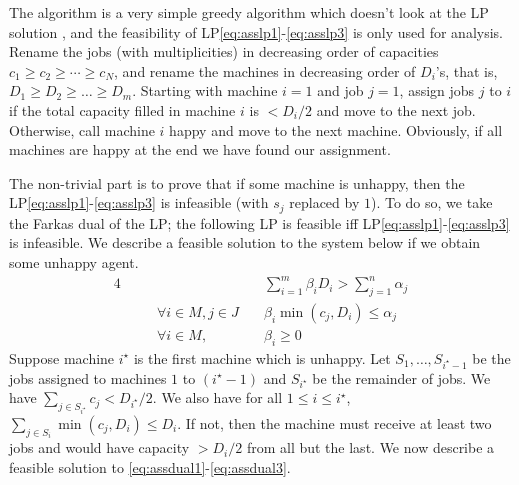 %

The algorithm is a  very simple greedy algorithm which doesn't look at the LP solution , and the feasibility of LP\eqref{eq:asslp1}-\eqref{eq:asslp3} is only used for analysis.  
Rename the jobs (with multiplicities) in decreasing order of capacities $c_1\geq c_2 \geq \cdots \geq c_N$, and rename  the machines in decreasing order of $D_i$'s, that is, $D_1 \geq D_2 \geq \ldots \geq D_m$. 
Starting with machine $i=1$ and job $j=1$, assign jobs $j$ to $i$ if the total capacity filled in machine $i$ is $< D_i/2$ and move to the next job. Otherwise, call machine $i$ happy and move to the next machine. Obviously, if all machines are happy at the end we have found our assignment. 

The non-trivial part is to  prove that if some machine is unhappy, then the LP\eqref{eq:asslp1}-\eqref{eq:asslp3} is infeasible (with $s_j$ replaced by $1$).
To do so, we take the Farkas dual of the LP; the following LP is feasible iff LP\eqref{eq:asslp1}-\eqref{eq:asslp3} is infeasible. We describe a feasible solution to the system below if we obtain some unhappy agent.
	\begin{alignat}{4}
		&&   & \quad \textstyle \sum_{i=1}^m \beta_i D_i > \sum_{j=1}^n\alpha_j \label{eq:assdual1}  \tag{F1} \\
		&& \quad \forall i\in M,j\in J & \quad \textstyle \beta_i\min(c_j,D_i) \leq \alpha_j \label{eq:assdual2} \tag{F2}  \\
		&& \quad \forall i\in M, &\quad  \beta_i \geq 0\label{eq:assdual3}\tag{F3}
	\end{alignat}
	\def\i{i^\star}
Suppose machine $\i$ is the first machine which is unhappy. Let $S_1,\ldots,S_{\i-1}$ be the jobs assigned to machines $1$ to $(\i-1)$ and $S_{i^\star}$ be the remainder of jobs. 
We have $\sum_{j\in S_{\i}} c_j < D_{\i}/2$. We also have for all $1\leq i\leq \i$, $\sum_{j\in S_i} \min(c_j,D_i) \leq D_i$. If not, then the machine must receive at least two jobs and would have capacity $> D_i/2$ 
from all but the last. 
We now describe a feasible solution to \eqref{eq:assdual1}-\eqref{eq:assdual3}.

